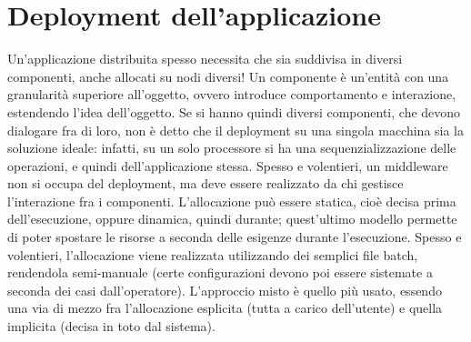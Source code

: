\section{Deployment dell'applicazione}
Un'applicazione distribuita spesso necessita che sia suddivisa in diversi
componenti, anche allocati su nodi diversi!
Un componente è un'entità con una granularità superiore all'oggetto, ovvero
introduce comportamento e interazione, estendendo l'idea dell'oggetto.
Se si hanno quindi diversi componenti, che devono dialogare fra di loro, non è detto che il deployment su una singola
macchina sia la soluzione ideale: infatti, su un solo processore si ha una sequenzializzazione delle operazioni, e
quindi dell'applicazione stessa.
Spesso e volentieri, un middleware non si occupa del deployment, ma deve essere realizzato da chi gestisce l'interazione
fra i componenti. L'allocazione può essere statica, cioè decisa prima dell'esecuzione, oppure dinamica, quindi
durante; quest'ultimo modello permette di poter spostare le risorse a seconda delle esigenze durante l'esecuzione.
Spesso e volentieri, l'allocazione viene realizzata utilizzando dei semplici file batch, rendendola semi-manuale (certe
configurazioni devono poi essere sistemate a seconda dei casi dall'operatore).
L'approccio misto è quello più usato, essendo una via di mezzo fra l'allocazione esplicita (tutta a carico dell'utente)
e quella implicita (decisa in toto dal sistema).


